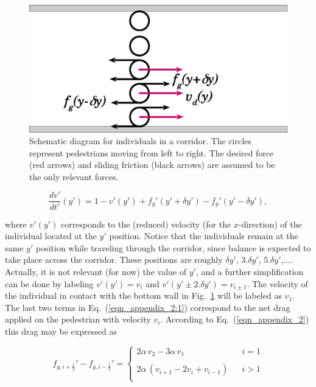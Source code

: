\documentclass[preprint,12pt]{elsarticle}
\begin{document}
\begin{figure}[htbp!]
\centering
\includegraphics[width=0.7\columnwidth]
{./pasillo.eps}
\caption{\label{pasillo} Schematic diagram for individuals in a corridor. 
The circles represent pedestrians moving from left to right. The desired force 
(red arrows) and sliding friction (black arrows) are assumed to be the only 
relevant forces.}
\end{figure}

 
\begin{equation}
\displaystyle\frac{dv'}{dt'}(y')=1-v'(y')+f_g'(y'+\delta 
y')-f_g'(y'-\delta y'),\label{eqn_appendix_2:1}
 \end{equation}

where $v'(y')$ corresponds to the (reduced) velocity (for the $x$-direction) of 
the individual located at the $y'$ position. Notice that the individuals 
remain at the same $y'$ position while traveling through the corridor, since 
balance is expected to take place across the corridor. These positions are 
roughly $\delta y'$, $3.\delta y'$, $5.\delta y'$,.... Actually, it is not 
relevant (for now) the value of $y'$, and a further simplification can be done 
by labeling $v'(y')=v_i$ and $v'(y'\pm 2.\delta y')=v_{i\pm 1}$. The velocity 
of the individual in contact with the bottom wall in Fig.~\ref{pasillo} will be 
labeled as $v_1$. \\

The last two terms in Eq.~(\ref{eqn_appendix_2:1}) correspond to the 
net drag applied on the pedestrian with velocity $v_i$. According to 
Eq.~(\ref{eqn_appendix_2}) this drag may be expressed as

\begin{equation}
 f_{g,i+\frac{1}{2}}'-f_{g,i-\frac{1}{2}}'=
  \left\{\begin{array}{lcl}
          2\alpha\,v_{2}-3\alpha\,v_{1} &  & i=1 \\
          & & \\
          2\alpha\,(v_{i+1}-2v_i+v_{i-1}) & & i>1\\
         \end{array}\right.\label{eqn_appendix_2:2}
\end{equation}
\end{document}
